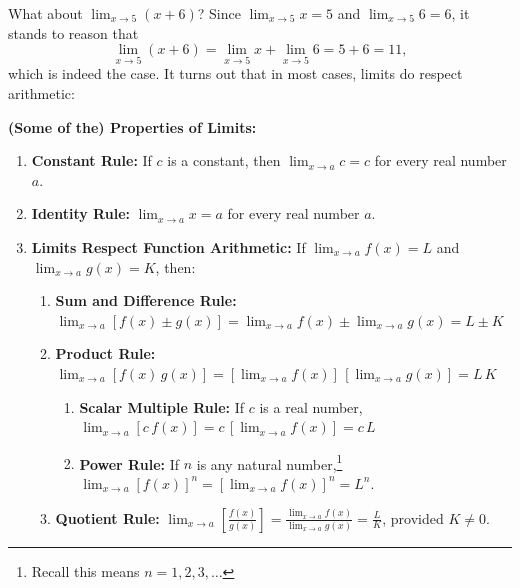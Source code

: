 \documentclass{ximera}
\begin{document}
What about $\lim_{x \rightarrow 5}  (x+6)$?  Since $\lim_{x \rightarrow 5} x = 5$ and $\lim_{x \rightarrow 5} 6 = 6$, it stands to reason that \[\lim_{x \rightarrow 5}  (x+6) = \lim_{x \rightarrow 5} x  + \lim_{x \rightarrow 5} 6 = 5 + 6 = 11,\] which is indeed the case.  It turns out that in most cases, limits do respect arithmetic:



\begin{theorem}\label{LimitProp01}  \textbf{(Some of the) Properties of Limits:}

\begin{enumerate}

\item  \textbf{Constant Rule:} If $c$ is a constant, then $ \lim_{x \rightarrow a} c = c$ for every real number $a$.

\item \textbf{Identity Rule:} $\lim_{x \rightarrow a} x = a$ for every real number $a$.

\item  \textbf{Limits Respect Function Arithmetic:}  If $\lim_{x \rightarrow a} f(x) = L$ and $\lim_{x \rightarrow a} g(x) = K$, then:

\begin{enumerate}

\item \textbf{Sum and Difference Rule:}  $\lim_{x \rightarrow a} \left[f(x)\pm g(x)\right] =
\lim_{x \rightarrow a} f(x) \pm \lim_{x \rightarrow a} g(x) = L
\pm K$

\item \textbf{Product Rule:}  $\lim_{x \rightarrow a} \left[f(x) \, g(x)\right] =
\left[\lim_{x \rightarrow a} f(x)\right] \, \left[ \lim_{x
\rightarrow a} g(x)\right] = L \, K$

\begin{enumerate}

\item \textbf{Scalar Multiple Rule:}  If $c$ is a real number, $\lim_{x \rightarrow a} \left[c \, f(x)\right] =
c \, \left[\lim_{x \rightarrow a} f(x)\right] =c \, L$


\item \textbf{Power Rule:}  If   $n$ is any
natural number,\footnote{Recall this means  $n = 1,2,3,\ldots$}
$\lim_{x \rightarrow a} \left[f(x)\right]^{n} = \left[
\lim_{x \rightarrow a} f(x) \right]^{n}= L^{n}$.
\end{enumerate}

\item \textbf{Quotient Rule:}  $\lim_{x \rightarrow a} \left[ \frac{f(x)}{g(x)}\right]
= \frac{\lim_{x \rightarrow a} f(x)} { \lim_{x
\rightarrow a} g(x)} = \frac{L}{K}$, provided $K \neq 0$.


\end{enumerate}
\end{enumerate}
\end{theorem}
\end{document}
